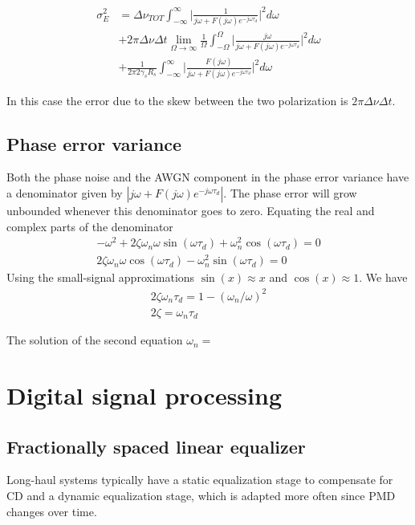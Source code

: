 \documentclass[a4paper]{article}
\begin{document}
\begin{align} \nonumber
\sigma_E^2 &= \Delta\nu_{TOT}\int_{-\infty}^\infty \bigg|\frac{1}{j\omega +  F(j\omega)e^{-j\omega\tau_d}}\bigg|^2d\omega \\
& + 2\pi\Delta\nu\Delta t \lim_{\Omega\to\infty}\frac{1}{\Omega}\int_{-\Omega}^\Omega \bigg|\frac{j\omega}{j\omega +  F(j\omega)e^{-j\omega\tau_d}}\bigg|^2d\omega \\
&+ \frac{1}{2\pi 2\gamma_sR_s}\int_{-\infty}^\infty \bigg|\frac{F(j\omega)}{j\omega + F(j\omega)e^{-j\omega\tau_d}}\bigg|^2d\omega \nonumber
\end{align}

In this case the error due to the skew between the two polarization is $2\pi\Delta\nu\Delta t$.

\subsection{Phase error variance}

Both the phase noise and the AWGN component in the phase error variance have a denominator given by $|j\omega + F(j\omega)e^{-j\omega\tau_d}|$. The phase error will grow unbounded whenever this denominator goes to zero. Equating the real and complex parts of the denominator
\begin{align}
-\omega^2 + 2\zeta\omega_n\omega\sin(\omega\tau_d) + \omega_n^2\cos(\omega\tau_d) = 0 \\
2\zeta\omega_n\omega\cos(\omega\tau_d) - \omega_n^2\sin(\omega\tau_d) = 0
\end{align}
Using the small-signal approximations $\sin(x)\approx x$ and $\cos(x) \approx 1$. We have
\begin{align}
2\zeta\omega_n\tau_d = 1 - (\omega_n/\omega)^2 \\
2\zeta = \omega_n\tau_d
\end{align}

The solution of the second equation $\omega_n = \frac{}{}$

\section{Digital signal processing}

\subsection{Fractionally spaced linear equalizer}

Long-haul systems typically have a static equalization stage to compensate for CD and a dynamic equalization stage, which is adapted more often since PMD changes over time.
\end{document}
